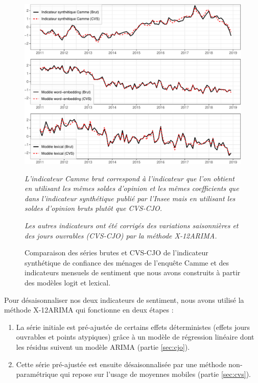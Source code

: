 \documentclass[11pt,french,french]{article}
\begin{document}
\begin{figure}[htp]
{\centering\includegraphics[width = \textwidth]{img/rmd-graphCVS-1}}
\captionsetup{margin=0cm,format=hang,justification=justified}
\caption{Comparaison des séries brutes et CVS-CJO de l'indicateur synthétique de confiance des ménages de l'enquête Camme et des indicateurs mensuels de sentiment que nous avons construits à partir des modèles logit et lexical.}\label{fig:cvscjo}
\footnotesize

\emph{L'indicateur Camme brut correspond à l'indicateur que l'on obtient en utilisant les mêmes soldes d'opinion et les mêmes coefficients que dans l'indicateur synthétique publié par l'Insee mais en utilisant les soldes d'opinion bruts plutôt que CVS-CJO.}

\emph{Les autres indicateurs ont été corrigés des variations saisonnières et des jours ouvrables (CVS-CJO) par la méthode X-12ARIMA.}
\end{figure}

Pour désaisonnaliser nos deux indicateurs de sentiment, nous avons
utilisé la méthode X-12ARIMA qui fonctionne en deux étapes :

\begin{enumerate}
\def\labelenumi{\arabic{enumi}.}
\item
  La série initiale est pré-ajustée de certains effets déterministes
  (effets jours ouvrables et points atypiques) grâce à un modèle de
  régression linéaire dont les résidus suivent un modèle ARIMA (partie
  \ref{sec:cjo}).
\item
  Cette série pré-ajustée est ensuite désaisonnalisée par une méthode
  non-paramétrique qui repose sur l'usage de moyennes mobiles (partie
  \ref{sec:cvs}).
\end{enumerate}
\end{document}
